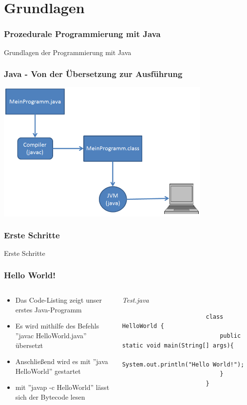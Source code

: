 
\section{Grundlagen}
\begin{frame}
\frametitle{Prozedurale Programmierung mit Java}
	\huge Grundlagen der Programmierung mit Java
\end{frame}

\begin{frame} 
	\frametitle{Java - Von der \"Ubersetzung zur Ausf\"uhrung}
	\center
	\includegraphics[width=0.8\textwidth,
	keepaspectratio=true]{bilder/java_process.png}
\end{frame}

\begin{frame}[fragile]
	\frametitle{Erste Schritte}
	\huge Erste Schritte
\end{frame}

\begin{frame}[fragile]
	\frametitle{Hello World!}
		\begin{columns}
		\begin{column}{0.5\textwidth}
			\small
			\begin{itemize}
			  \item Das Code-Listing zeigt unser erstes Java-Programm
			  \item Es wird mithilfe des Befehls ''javac HelloWorld.java'' 
			  übersetzt
			  \item Anschließend wird es mit ''java HelloWorld'' gestartet
			  \item mit ''javap -c HelloWorld'' lässt sich der Bytecode lesen
			\end{itemize}
			\normalsize
		\end{column}
		\begin{column}{0.5\textwidth}{\tiny \itshape Test.java}
			\begin{lstlisting}
						class HelloWorld {
							public static void main(String[] args){
								System.out.println("Hello World!");
							}
						}
			\end{lstlisting}
	\end{column}
	\end{columns}
\end{frame}

